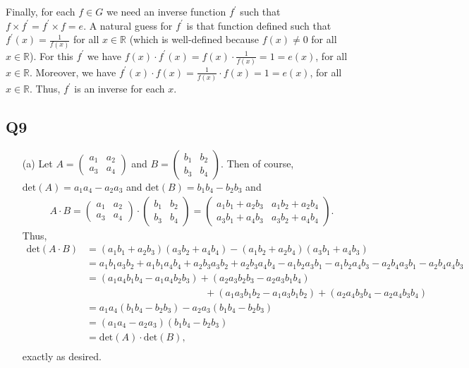 \documentclass[12pt]{article}
\def\R{{\mathbb R}}        %
\numberwithin{theorem}{section}
\numberwithin{equation}{section}
\numberwithin{remark}{section}
\numberwithin{definition}{section}
\numberwithin{theorem}{section}
\numberwithin{lemma}{section}
\numberwithin{example}{section}
\begin{document}
Finally, for each $f\in G$ we need an inverse function $f^\prime$ such that $f\times f^\prime = f^\prime \times f = e$. A natural guess for $f^\prime$ is that function defined such that $f^\prime(x)=\frac{1}{f(x)}$ for all $x\in \R$ (which is well-defined because $f(x)\neq0$ for all $x\in \R$). For this $f^\prime$ we have $f(x)\cdot f^\prime(x)=f(x)\cdot\frac{1}{f(x)}=1=e(x)$, for all $x\in \R$. Moreover, we have $f^\prime(x)\cdot f(x)=\frac{1}{f(x)}\cdot f(x)=1=e(x)$, for all $x\in \R$. Thus, $f^\prime$ is an inverse for each $x$. 



\subsection{Q9}

\begin{itemize}
	\item[(a)]{Let $A=\begin{pmatrix}a_1 & a_2\\ a_3 & a_4 \end{pmatrix}$ and $B=\begin{pmatrix}b_1 & b_2\\ b_3 & b_4 \end{pmatrix}$. Then of course, $\text{det}(A)=a_1a_4-a_2a_3$ and $\text{det}(B)=b_1b_4-b_2b_3$ and
		\begin{align*}
			A\cdot B = \begin{pmatrix}a_1 & a_2\\ a_3 & a_4 \end{pmatrix}\cdot \begin{pmatrix}b_1 & b_2\\ b_3 & b_4 \end{pmatrix} = \begin{pmatrix}a_1 b_1+a_2b_3& a_1b_2+a_2b_4\\ a_3b_1+a_4b_3 & a_3b_2+a_4b_4 \end{pmatrix}.
		\end{align*}
	Thus, 	
		\begin{align*}
			\text{det}(A\cdot B) & = (a_1 b_1+a_2b_3)(a_3b_2+a_4b_4) - (a_1b_2+a_2b_4) (a_3b_1+a_4b_3) \\
			& = a_1b_1a_3b_2+a_1b_1a_4b_4+a_2b_3a_3b_2+a_2b_3a_4b_4-a_1b_2a_3b_1-a_1b_2a_4b_3-a_2b_4a_3b_1-a_2b_4a_4b_3\\
			& = (a_1a_4b_1b_4-a_1a_4b_2b_3)+(a_2a_3b_2b_3-a_2a_3b_1b_4)\\
			&\qquad\qquad\qquad\qquad\qquad\qquad+(a_1a_3b_1b_2-a_1a_3b_1b_2)+(a_2a_4b_3b_4-a_2a_4b_3b_4)\\
			& = a_1a_4(b_1b_4-b_2b_3)-a_2a_3(b_1b_4-b_2b_3)\\
			& = (a_1a_4-a_2a_3)(b_1b_4-b_2b_3)\\
			& = \text{det}(A)\cdot\text{det}(B),\\
		\end{align*}
	exactly as desired.}
\end{itemize}
\end{document}
